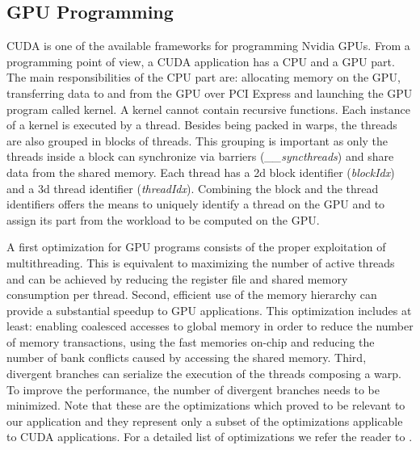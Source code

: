 \subsection{GPU Programming}

CUDA is one of the available frameworks for programming Nvidia GPUs. From a
programming point of view, a CUDA application has a CPU and a GPU part. The main
responsibilities of the CPU part are: allocating memory  on the GPU,
transferring data to and from the GPU over PCI Express and launching the GPU
program called kernel. A kernel cannot contain recursive functions. Each
instance of a kernel is executed by a thread. Besides being packed in warps, the
threads are also grouped in blocks of threads. This grouping is important as
only the threads inside a block can synchronize via barriers
(\emph{\_\_syncthreads}) and share data from the shared memory. Each thread has
a 2d block identifier (\emph{blockIdx}) and a 3d thread identifier
(\emph{threadIdx}). Combining the block and the thread identifiers offers the
means to uniquely identify a thread on the GPU and to assign its part from the
workload to be computed on the GPU.

A first optimization for GPU programs consists of the proper exploitation of
multithreading. This is equivalent to maximizing the number of active threads
and can be achieved by reducing the register file and shared memory consumption
per thread. Second, efficient use of the memory hierarchy can provide a
substantial speedup to GPU applications. This optimization includes at least:
enabling coalesced accesses to global memory in order to reduce the number of
memory transactions, using the fast memories on-chip and reducing the number of
bank conflicts caused by accessing the shared memory. Third, divergent branches
can serialize the execution of the threads composing a warp. To improve the
performance, the number of divergent branches needs to be minimized. Note that
these are the optimizations which proved to be relevant to our application and
they represent only a subset of the optimizations applicable to CUDA
applications. For a detailed list of optimizations we refer the reader to
\cite{cuda}.



